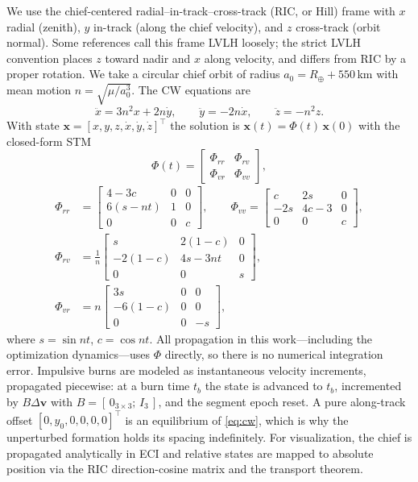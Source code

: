 \documentclass[10pt,twocolumn,letterpaper]{article}
\begin{document}
We use the chief-centered radial--in-track--cross-track (RIC, or Hill) frame
with $x$ radial (zenith), $y$ in-track (along the chief velocity), and $z$
cross-track (orbit normal). Some references call this frame LVLH loosely; the
strict LVLH convention places $z$ toward nadir and $x$ along velocity, and
differs from RIC by a proper rotation. We take a circular chief orbit of
radius $a_0 = R_\oplus + 550$\,km with mean motion $n = \sqrt{\mu/a_0^3}$. The
CW equations are
\begin{equation}
\label{eq:cw}
\ddot{x} = 3n^2 x + 2n\dot{y}, \qquad
\ddot{y} = -2n\dot{x}, \qquad
\ddot{z} = -n^2 z .
\end{equation}
With state $\mathbf{x} = [x,y,z,\dot x,\dot y,\dot z]^\top$ the solution is
$\mathbf{x}(t) = \Phi(t)\,\mathbf{x}(0)$ with the closed-form STM
\begin{equation}
\label{eq:stm}
\Phi(t) =
\begin{bmatrix}
\Phi_{rr} & \Phi_{rv} \\ \Phi_{vr} & \Phi_{vv}
\end{bmatrix},
\end{equation}
{\small
\begin{align*}
\Phi_{rr} &= \begin{bmatrix} 4-3c & 0 & 0 \\ 6(s-nt) & 1 & 0 \\ 0 & 0 & c \end{bmatrix},
\qquad
\Phi_{vv} = \begin{bmatrix} c & 2s & 0 \\ -2s & 4c-3 & 0 \\ 0 & 0 & c \end{bmatrix}, \\
\Phi_{rv} &= \tfrac{1}{n}\begin{bmatrix} s & 2(1-c) & 0 \\ -2(1-c) & 4s-3nt & 0 \\ 0 & 0 & s \end{bmatrix}, \\
\Phi_{vr} &= n\begin{bmatrix} 3s & 0 & 0 \\ -6(1-c) & 0 & 0 \\ 0 & 0 & -s \end{bmatrix},
\end{align*}}%
where $s = \sin nt$, $c = \cos nt$. All propagation in this work---including
the optimization dynamics---uses $\Phi$ directly, so there is no numerical
integration error. Impulsive burns are modeled as instantaneous velocity
increments, propagated piecewise: at a burn time $t_b$ the state is advanced
to $t_b$, incremented by $B\Delta\mathbf{v}$ with $B = [\,0_{3\times3};\,
I_3\,]$, and the segment epoch reset. A pure along-track offset
$[0,y_0,0,0,0,0]^\top$ is an equilibrium of \eqref{eq:cw}, which is why the
unperturbed formation holds its spacing indefinitely. For visualization, the
chief is propagated analytically in ECI and relative states are mapped to
absolute position via the RIC direction-cosine matrix and the transport
theorem.
\end{document}
